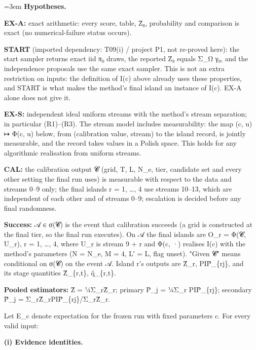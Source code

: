 \documentclass[11pt]{report}
\newenvironment{mdblock}{\begingroup\mdfont\raggedright\setlength{\parindent}{0pt}\setlength{\parskip}{0.55em}\emergencystretch=3em}{\par\endgroup}
\newcommand{\mdhead}[2]{\par\vspace{0.7em}\noindent{\bfseries\ifcase#1\or\large\or\normalsize\or\normalsize\or\small\or\small\or\small\fi #2}\par\nopagebreak\vspace{0.1em}}
\begin{document}
\begin{mdblock}
\textbf{Hypotheses.}

\begin{mdbul}
\item \textbf{EX-A:} exact arithmetic: every score, table, Z̄₀, probability and comparison is exact (no numerical-failure status occurs).
\item \textbf{START} (imported dependency: T09(i) / project P1, not re-proved here): the start sampler returns exact iid π₀ draws, the reported Z̄₀ equals Σ\_Ω γ₀, and the independence proposals use the same exact sampler. This is not an extra restriction on inputs: the definition of I(c) above already uses these properties, and START is what makes the method's final island an instance of I(c). EX-A alone does not give it.
\item \textbf{EX-S:} independent ideal uniform streams with the method's stream separation; in particular (R1)–(R3). The stream model includes measurability: the map (c, u) ↦ Φ(c, u) below, from (calibration value, stream) to the island record, is jointly measurable, and the record takes values in a Polish space. This holds for any algorithmic realisation from uniform streams.
\item \textbf{CAL:} the calibration output 𝓒 (grid, T, L, N\_e, tier, candidate set and every other setting the final run uses) is measurable with respect to the data and streams 0–9 only; the final islands r = 1, …, 4 use streams 10–13, which are independent of each other and of streams 0–9; escalation is decided before any final randomness.
\item \textbf{Success:} 𝒜 ∈ σ(𝓒) is the event that calibration succeeds (a grid is constructed at the final tier, so the final run executes). On 𝒜 the final islands are O\_r = Φ(𝓒, U\_r), r = 1, …, 4, where U\_r is stream 9 + r and Φ(c, ·) realises I(c) with the method's parameters (N = N\_e, M = 4, L′ = L, flag unset). "Given 𝓒" means conditional on σ(𝓒) on the event 𝒜. Island r's outputs are Ẑ\_r, PIP̂\_\{rj\}, and its stage quantities Ẑ\_\{r,t\}, q̂\_\{r,t\}.
\item \textbf{Pooled estimators:} Ẑ = ¼Σ\_rẐ\_r; primary P̄\_j = ¼Σ\_r PIP̂\_\{rj\}; secondary P̃\_j = Σ\_rẐ\_rPIP̂\_\{rj\}/Σ\_rẐ\_r.
\end{mdbul}

\mdhead{2}{3. Conclusions}

Let E\_c denote expectation for the frozen run with fixed parameters c. For every valid input:

\textbf{(i) Evidence identities.}


\end{mdblock}
\end{document}
